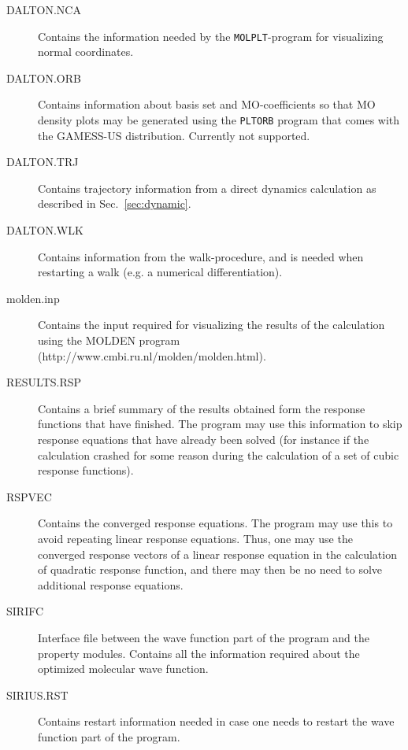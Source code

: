 \begin{description}
\item[DALTON.NCA] Contains the information needed by the
\verb|MOLPLT|-program for visualizing normal coordinates.

\item[DALTON.ORB] Contains information about basis set and
MO-coefficients so that MO density plots may be generated using the
\verb|PLTORB| program that comes with the GAMESS-US
distribution. Currently not supported.

\item[DALTON.TRJ] Contains trajectory information from a direct
dynamics calculation as described in
Sec.~\ref{sec:dynamic}.

\item[DALTON.WLK] Contains information from the walk-procedure, and is
needed when restarting a walk (e.g. a numerical differentiation).

\item[molden.inp] Contains the input required for visualizing the
  results of the calculation using the MOLDEN program
  (http://www.cmbi.ru.nl/molden/molden.html). 

\item[RESULTS.RSP] Contains a brief summary of the results obtained
  form the response functions that have finished. The program may use
  this information to skip response equations that have already been
  solved (for instance if the calculation crashed for some reason
  during the calculation of a set of cubic response functions).

\item[RSPVEC] Contains the converged response equations. The program
  may use this to avoid repeating linear response equations. Thus, one
  may use the converged response vectors of a linear response equation
  in the calculation of quadratic response function, and there may
  then be no need to solve additional response equations.

\item[SIRIFC] Interface file between the wave function part of the
  program and the property modules. Contains all the information
  required about the optimized molecular wave function.

\item[SIRIUS.RST] Contains restart information needed in case one
  needs to restart the wave function part of the program.
\end{description}
